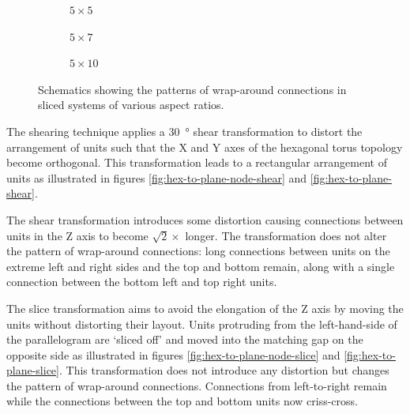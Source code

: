 \begin{figure}
				\caption[Rectangularisation of wrapped triple partitioned toruses.]%
				{Rectangularisation of wrapped triple partitioned hexagonal
				toruses. Thin lines show wrap-around links.  Flat-topped hexagons
				represent wrapped triple partitioned units.}
				\label{fig:hex-to-plane}
				
				
				
				\center
				\begin{subfigure}[b]{0.3\linewidth}
					\center
					\caption{$5\times5$}
				\end{subfigure}
				\begin{subfigure}[b]{0.3\linewidth}
					\center
					\caption{$5\times7$}
				\end{subfigure}
				\begin{subfigure}[b]{0.3\linewidth}
					\center
					\caption{$5\times10$}
				\end{subfigure}
				
				\caption[Patterns of wrap-around connections in sliced systems.]%
				{Schematics showing the patterns of wrap-around connections in sliced
				systems of various aspect ratios.}
				\label{fig:slicing-examples}
			\end{figure}
			
			The shearing technique applies a \SI{30}{\degree} shear transformation to
			distort the arrangement of units such that the X and Y axes of the
			hexagonal torus topology become orthogonal. This transformation leads to
			a rectangular arrangement of units as illustrated in figures
			\ref{fig:hex-to-plane-node-shear} and \ref{fig:hex-to-plane-shear}.
			
			The shear transformation introduces some distortion causing connections
			between units in the Z axis to become $\sqrt{2} \times$ longer. The
			transformation does not alter the pattern of wrap-around connections:
			long connections between units on the extreme left and right sides and
			the top and bottom remain, along with a single connection between the
			bottom left and top right units.
			
			The slice transformation aims to avoid the elongation of the Z axis by
			moving the units without distorting their layout. Units protruding from
			the left-hand-side of the parallelogram are `sliced off' and moved into
			the matching gap on the opposite side as illustrated in figures
			\ref{fig:hex-to-plane-node-slice} and \ref{fig:hex-to-plane-slice}. This
			transformation does not introduce any distortion but changes the pattern
			of wrap-around connections.  Connections from left-to-right remain while
			the connections between the top and bottom units now criss-cross.
			
